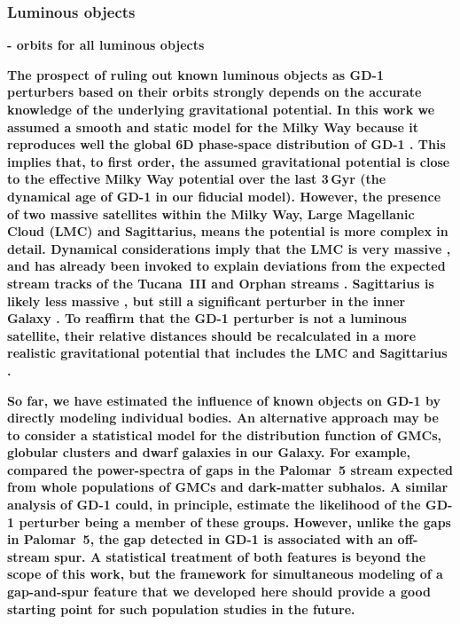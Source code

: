 \documentclass[twocolumn]{aastex62}
\newcommand{\changes}[1]{{\textbf{#1}}}
\begin{document}
\subsubsection{Luminous objects}
\changes{
- orbits for all luminous objects
}

\changes{
The prospect of ruling out known luminous objects as GD-1 perturbers based on their orbits strongly depends on the accurate knowledge of the underlying gravitational potential.
In this work we assumed a smooth and static model for the Milky Way \citep{pw2017} because it reproduces well the global 6D phase-space distribution of GD-1 \citep{pwb}.
This implies that, to first order, the assumed gravitational potential is close to the effective Milky Way potential over the last 3\,Gyr (the dynamical age of GD-1 in our fiducial model).
However, the presence of two massive satellites within the Milky Way, Large Magellanic Cloud (LMC) and Sagittarius, means the potential is more complex in detail.
Dynamical considerations imply that the LMC is very massive \citep[$\sim10^{11}\rm M_\odot$, e.g.,][]{kallivayalil2013, gomez2015, penarrubia2016}, and has already been invoked to explain deviations from the expected stream tracks of the Tucana~III and Orphan streams \citep[respectively]{erkal2018, erkal2019}.
Sagittarius is likely less massive \citep[$\sim10^9-10^{11}\rm M_\odot$,][]{jiang2000}, but still a significant perturber in the inner Galaxy \citep[e.g.,][]{laporte2019a, laporte2019b}.
To reaffirm that the GD-1 perturber is not a luminous satellite, their relative distances should be recalculated in a more realistic gravitational potential that includes the LMC and Sagittarius \citep[for example, as a time-dependent expansion of basis functions,][]{ngc2019}.
}

\changes{
So far, we have estimated the influence of known objects on GD-1 by directly modeling individual bodies.
An alternative approach may be to consider a statistical model for the distribution function of GMCs, globular clusters and dwarf galaxies in our Galaxy.
For example, \citet{banik2019} compared the power-spectra of gaps in the Palomar~5 stream expected from whole populations of GMCs and dark-matter subhalos.
A similar analysis of GD-1 could, in principle, estimate the likelihood of the GD-1 perturber being a member of these groups.
However, unlike the gaps in Palomar~5, the gap detected in GD-1 is associated with an off-stream spur.
A statistical treatment of both features is beyond the scope of this work, but the framework for simultaneous modeling of a gap-and-spur feature that we developed here should provide a good starting point for such population studies in the future.
}
\end{document}

